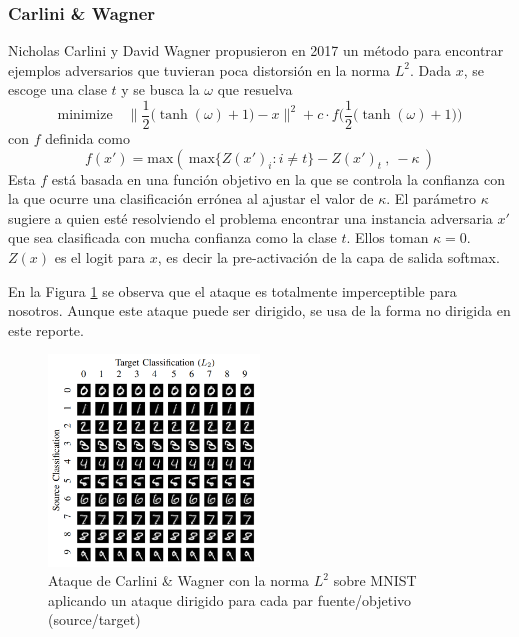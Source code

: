 \subsubsection{Carlini \& Wagner}
Nicholas Carlini y David Wagner \cite{carlini2017evaluating} propusieron en 2017 un método para encontrar ejemplos adversarios que tuvieran poca distorsión en la norma $L^2$. Dada $x$, se escoge una clase $t$ y se busca la $\omega$ que resuelva
\begin{equation*}
    \text{minimize} \quad \Big\lVert \dfrac{1}{2}\big(\tanh(\omega) + 1\big) - x \Big\rVert^2 + c\cdot f\bigg(\dfrac{1}{2}\big(\tanh(\omega) + 1\big)\bigg)
\end{equation*}
con $f$ definida como
\begin{equation*}
    f(x') = \text{max}(\ \text{max}\{Z(x')_i : i\neq t\} - Z(x')_t\ ,\ -\kappa\ )
\end{equation*}
Esta $f$ está basada en una función objetivo en la que se controla la confianza con la que ocurre una clasificación errónea al ajustar el valor de $\kappa$. El parámetro $\kappa$ sugiere a quien esté resolviendo el problema encontrar una instancia adversaria $x'$ que sea clasificada con mucha confianza como la clase $t$. Ellos toman $\kappa = 0$. $Z(x)$ es el logit para $x$, es decir la pre-activación de la capa de salida softmax.

En la Figura \ref{CW} se observa que el ataque es totalmente imperceptible para nosotros. Aunque este ataque puede ser dirigido, se usa de la forma no dirigida en este reporte. 

\begin{figure}[h!]
    \centering
    \includegraphics[width=0.5\textwidth]{images/CW/CW_L2.png}
    \caption{Ataque de Carlini \& Wagner con la norma $L^2$ sobre MNIST aplicando un ataque dirigido para cada par fuente/objetivo (source/target)}
    \label{CW}
\end{figure}


